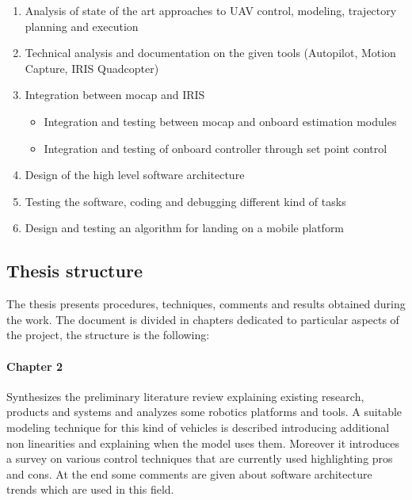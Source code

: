 \begin{enumerate}

\item Analysis of state of the art approaches to UAV control, modeling, trajectory planning and execution

\item Technical analysis and documentation on the given tools (Autopilot, Motion Capture, IRIS Quadcopter)

\item Integration between mocap and IRIS
\begin{itemize}

\item Integration and testing between mocap and onboard estimation modules
\item Integration and testing of onboard controller through set point control

\end{itemize}

\item Design of the high level software architecture 
\item Testing the software, coding and debugging different kind of tasks
\item Design and testing an algorithm for landing on a mobile platform

\end{enumerate}

\subsection{Thesis structure}
The thesis presents procedures, techniques, comments and results obtained during the work. The document is divided in chapters dedicated to particular aspects of the project, the structure is the following: 

\paragraph{Chapter 2} Synthesizes the preliminary literature review explaining existing research, products and systems and analyzes some robotics platforms and tools. A suitable modeling technique for this kind of vehicles is described introducing additional non linearities and explaining when the model uses them.
Moreover it introduces a survey on various control techniques that are currently used highlighting pros and cons. At the end some comments are given about software architecture trends which are used in this field. 


